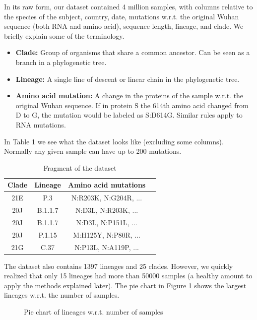 \documentclass[twoside,twocolumn]{article}
\begin{document}
	In its raw form, our dataset contained 4 million samples, with columns relative to the species of the subject, country, date, mutations w.r.t. the original Wuhan sequence (both RNA and amino acid), sequence length, lineage, and clade. We briefly explain some of the terminology.
	\begin{itemize}
		\item \textbf{Clade: }Group of organisms that share a common ancestor. Can be seen as a branch in a phylogenetic tree.
		\item \textbf{Lineage: } A single line of descent or linear chain in the phylogenetic tree.
		\item \textbf{Amino acid mutation: } A change in the proteins of the sample w.r.t. the original Wuhan sequence. If in protein S the 614th amino acid changed from D to G, the mutation would be labeled as S:D614G. Similar rules apply to RNA mutations\cite{nomenclature}.
	\end{itemize}
	In Table 1 we see what the dataset looks like (excluding some columns). Normally any given sample can have up to 200 mutations. 
	\begin{table}
		\caption{Fragment of the dataset}
		\centering
			\renewcommand{\arraystretch}{1.2} %
		\begin{tabular}{|c|c|c|c|}
			\hline
			Clade & Lineage & Amino acid mutations \\
			\hline
			21E  & P.3& N:R203K, N:G204R, ... \\
			20J & B.1.1.7 & N:D3L, N:R203K, ...\\
			20J & B.1.1.7 & N:D3L, N:P151L, ...\\
			20J & P.1.15 & M:H125Y, N:P80R, ...\\
			21G & C.37 & N:P13L, N:A119P, ...\\
			\hline
		\end{tabular}
	\end{table}
The dataset also contains 1397 lineages and 25 clades. However, we quickly realized that only 15 lineages had more than 50000 samples (a healthy amount to apply the methods explained later). The pie chart in Figure 1 shows the largest lineages w.r.t. the number of samples. 
\begin{figure}
	\caption{Pie chart of lineages w.r.t. number of samples} \label{piechart}
\end{figure}
\end{document}
